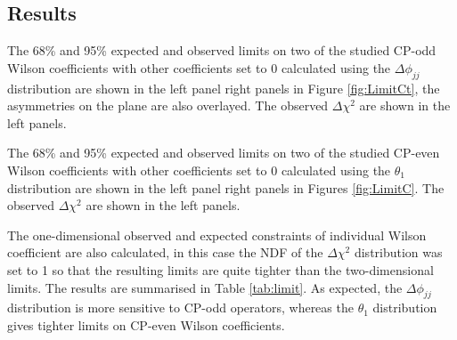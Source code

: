 \documentclass[a4paper,12pt]{article}
\begin{document}
		\subsection{Results}
			\par The 68\% and 95\% expected and observed limits on two of the studied CP-odd Wilson coefficients with 
			other coefficients set to 0 calculated using the $\Delta\phi_{jj}$ distribution are 
			shown in the left panel right panels in Figure \ref{fig:LimitCt}, the asymmetries on the plane are also overlayed. 
			The observed $\Delta\chi^2$ are shown in the left panels. 
			\par The 68\% and 95\% expected and observed limits on two of the studied CP-even Wilson coefficients with 
			other coefficients set to 0 calculated using the $\theta_1$ distribution are 
			shown in the left panel right panels in Figures \ref{fig:LimitC}.
			The observed $\Delta\chi^2$ are shown in the left panels. 
			\par The one-dimensional observed and expected constraints of individual Wilson coefficient are also calculated, 
			in this case the NDF of the $\Delta\chi^2$ distribution was set to 1 
			so that the resulting limits are quite tighter than the two-dimensional limits. The results are summarised in Table \ref{tab:limit}.
			As expected, the $\Delta\phi_{jj}$ distribution is more sensitive to CP-odd operators, whereas the $\theta_1$ distribution gives 
			tighter limits on CP-even Wilson coefficients.
\end{document}
